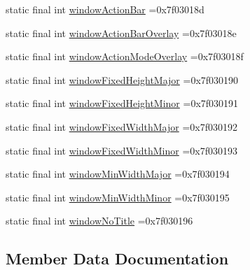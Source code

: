 \begin{DoxyCompactItemize}
static final int \mbox{\hyperlink{classbr_1_1unb_1_1cic_1_1mp_1_1marketmaster_1_1test_1_1R_1_1attr_a8a35164c9bc7fc6eec383316a3cccb67}{window\+Action\+Bar}} =0x7f03018d
\item 
static final int \mbox{\hyperlink{classbr_1_1unb_1_1cic_1_1mp_1_1marketmaster_1_1test_1_1R_1_1attr_ae5135755565bbfd7912d58be03f5683f}{window\+Action\+Bar\+Overlay}} =0x7f03018e
\item 
static final int \mbox{\hyperlink{classbr_1_1unb_1_1cic_1_1mp_1_1marketmaster_1_1test_1_1R_1_1attr_a6707e789ac979fb04dfa4870be99e21d}{window\+Action\+Mode\+Overlay}} =0x7f03018f
\item 
static final int \mbox{\hyperlink{classbr_1_1unb_1_1cic_1_1mp_1_1marketmaster_1_1test_1_1R_1_1attr_a679647465681936e352fb9c42bcb64c2}{window\+Fixed\+Height\+Major}} =0x7f030190
\item 
static final int \mbox{\hyperlink{classbr_1_1unb_1_1cic_1_1mp_1_1marketmaster_1_1test_1_1R_1_1attr_a641af7913b6ef58295b94b509cdb4751}{window\+Fixed\+Height\+Minor}} =0x7f030191
\item 
static final int \mbox{\hyperlink{classbr_1_1unb_1_1cic_1_1mp_1_1marketmaster_1_1test_1_1R_1_1attr_a119fef431afa59f408bee71b0c3f787a}{window\+Fixed\+Width\+Major}} =0x7f030192
\item 
static final int \mbox{\hyperlink{classbr_1_1unb_1_1cic_1_1mp_1_1marketmaster_1_1test_1_1R_1_1attr_aa1cb1a129c84de346409f06385e2f66c}{window\+Fixed\+Width\+Minor}} =0x7f030193
\item 
static final int \mbox{\hyperlink{classbr_1_1unb_1_1cic_1_1mp_1_1marketmaster_1_1test_1_1R_1_1attr_aa6e88a236914d2fb19ec86f44cc8e877}{window\+Min\+Width\+Major}} =0x7f030194
\item 
static final int \mbox{\hyperlink{classbr_1_1unb_1_1cic_1_1mp_1_1marketmaster_1_1test_1_1R_1_1attr_aa28a27ed51900b367fdf212626b68df8}{window\+Min\+Width\+Minor}} =0x7f030195
\item 
static final int \mbox{\hyperlink{classbr_1_1unb_1_1cic_1_1mp_1_1marketmaster_1_1test_1_1R_1_1attr_aa7c3980e07d6a45a3888c701a898f9b0}{window\+No\+Title}} =0x7f030196
\end{DoxyCompactItemize}


\subsection{Member Data Documentation}
\mbox{\label{classbr_1_1unb_1_1cic_1_1mp_1_1marketmaster_1_1test_1_1R_1_1attr_aa7b00db0042be84a7bdbf4e1c4deaa11}} 
